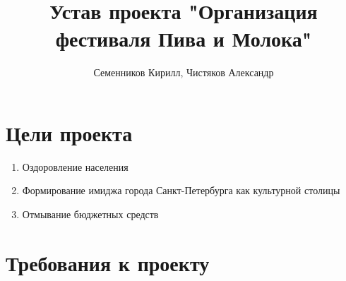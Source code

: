 \documentclass[a4paper,12pt]{article}
\author{Семенников Кирилл, Чистяков Александр}
\title{Устав проекта "Организация фестиваля Пива и Молока"}
\begin{document}
\maketitle
\section{Цели проекта}
\begin{enumerate}
  \item{Оздоровление населения}
  \item{Формирование имиджа города Санкт-Петербурга как культурной столицы}
  \item{Отмывание бюджетных средств}
\end{enumerate}
\section{Требования к проекту}
\end{document}
